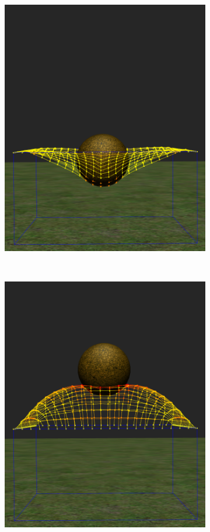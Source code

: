 \begin{figure}
 \centering
  \begin{subfigure}[b]{0.3\textwidth}
    \includegraphics[width=\textwidth]{img/04/gravityOff1}
  \end{subfigure}
~
  \begin{subfigure}[b]{0.3\textwidth}
    \includegraphics[width=\textwidth]{img/04/gravityOff2}

\end{subfigure}
\end{figure}
